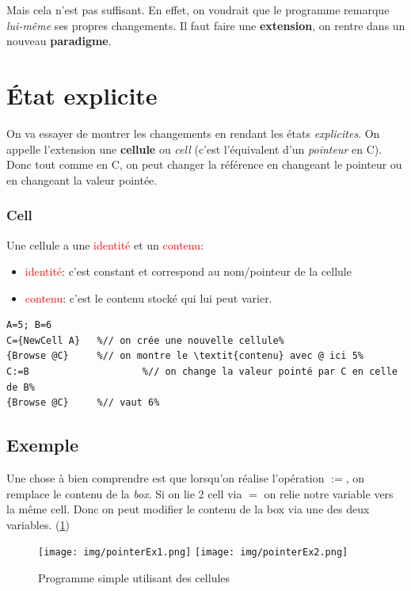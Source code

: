 \documentclass{report}
\begin{document}
Mais cela n'est pas suffisant. En effet, on voudrait que le programme remarque \textit{lui-même} ses propres changements. Il faut faire une \textbf{extension}, on rentre dans un nouveau \textbf{paradigme}.

\section{État explicite}
On va essayer de montrer les changements en rendant les états \textit{explicites}. On appelle l'extension une \textbf{cellule} ou \textit{cell} (c'est l'équivalent d'un \textit{pointeur} en C).\\
Donc tout comme en C, on peut changer la référence en changeant le pointeur ou en changeant la valeur pointée.

\subsubsection{Cell}
Une cellule a une \textcolor{red}{identité} et un \textcolor{red}{contenu}:

\begin{itemize}
\item \textcolor{red}{identité}: c'est constant et correspond au nom/pointeur de la cellule 
\item \textcolor{red}{contenu}: c'est le contenu stocké qui lui peut varier.
\end{itemize}

\begin{lstlisting}[escapechar=\%]
A=5; B=6
C={NewCell A}	%// on crée une nouvelle cellule%
{Browse @C}		%// on montre le \textit{contenu} avec @ ici 5%
C:=B					%// on change la valeur pointé par C en celle de B%
{Browse @C}		%// vaut 6%
\end{lstlisting}

\subsection{Exemple}
Une chose à bien comprendre est que lorsqu'on réalise l'opération $:=$, on remplace le contenu de la \textit{box}. Si on lie 2 cell via $=$ on relie notre variable vers la même cell. Donc on peut modifier le contenu de la box via une des deux variables. (\ref{pointerEx1})
\begin{figure}[H]
\centering
\texttt{[image: img/pointerEx1.png]}
\texttt{[image: img/pointerEx2.png]}
\caption{Programme simple utilisant des cellules}
\label{pointerEx1}
\end{figure}
\end{document}
